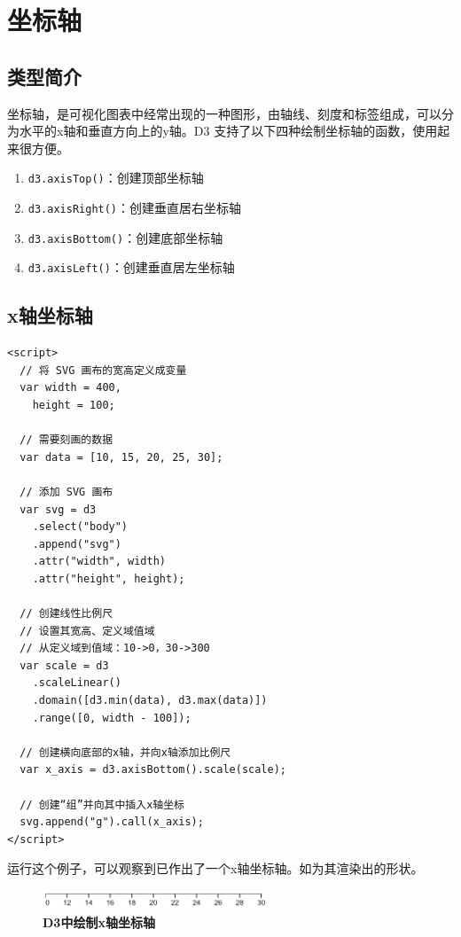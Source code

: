 \section{坐标轴}

\subsection{类型简介}

坐标轴，是可视化图表中经常出现的一种图形，由轴线、刻度和标签组成，可以分为水平的x轴和垂直方向上的y轴。D3 支持了以下四种绘制坐标轴的函数，使用起来很方便。

\begin{enumerate}
    \item \verb|d3.axisTop()|：创建顶部坐标轴
    \item \verb|d3.axisRight()|：创建垂直居右坐标轴
    \item \verb|d3.axisBottom()|：创建底部坐标轴
    \item \verb|d3.axisLeft()|：创建垂直居左坐标轴
\end{enumerate}

\subsection{x轴坐标轴}

\begin{verbatim}
<script>
  // 将 SVG 画布的宽高定义成变量
  var width = 400,
    height = 100;

  // 需要刻画的数据
  var data = [10, 15, 20, 25, 30];

  // 添加 SVG 画布
  var svg = d3
    .select("body")
    .append("svg")
    .attr("width", width)
    .attr("height", height);

  // 创建线性比例尺
  // 设置其宽高、定义域值域
  // 从定义域到值域：10->0，30->300
  var scale = d3
    .scaleLinear()
    .domain([d3.min(data), d3.max(data)])
    .range([0, width - 100]);

  // 创建横向底部的x轴，并向x轴添加比例尺
  var x_axis = d3.axisBottom().scale(scale);

  // 创建“组”并向其中插入x轴坐标
  svg.append("g").call(x_axis);
</script>
\end{verbatim}

运行这个例子，可以观察到已作出了一个x轴坐标轴。如为其渲染出的形状。

\begin{figure}[htbp]
    \centering
    \includegraphics[width=0.6\textwidth]{figure/D3/axis_x.png}
    \caption{\textbf{D3中绘制x轴坐标轴}}
    \label{fig:axis_x}
\end{figure}

